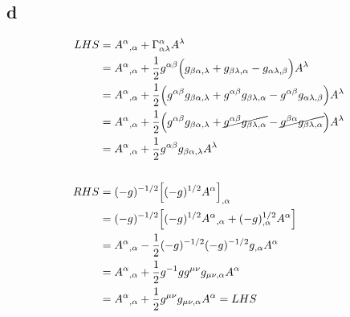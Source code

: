 \documentclass{article}
\begin{document}
\subsection*{d}
\begin{align*}
LHS &= A^\alpha{}_{,\alpha} + \Gamma^{\alpha}_{\alpha\lambda}A^\lambda \\
&= A^\alpha{}_{,\alpha} + \frac{1}{2}g^{\alpha\beta}\Big(g_{\beta\alpha,\lambda} + g_{\beta\lambda, \alpha} - g_{\alpha\lambda,\beta}\Big)A^\lambda \\
&= A^\alpha{}_{,\alpha} + \frac{1}{2}\Big(g^{\alpha\beta}g_{\beta\alpha,\lambda} + g^{\alpha\beta}g_{\beta\lambda, \alpha} -  g^{\alpha\beta}g_{\alpha\lambda,\beta}\Big)A^\lambda \\
&= A^\alpha{}_{,\alpha} + \frac{1}{2}\Big(g^{\alpha\beta}g_{\beta\alpha,\lambda} + \cancel{g^{\alpha\beta}g_{\beta\lambda, \alpha}} -  \cancel{g^{\beta\alpha}g_{\beta\lambda,\alpha}} \Big)A^\lambda  \\
&= A^\alpha{}_{,\alpha} + \frac{1}{2}g^{\alpha\beta}g_{\beta\alpha,\lambda}A^\lambda\\\\
RHS &= (-g)^{-1/2}\Big[(-g)^{1/2}A^\alpha\Big]_{,\alpha} \\
&= (-g)^{-1/2}\Big[(-g)^{1/2}A^\alpha{}_{,\alpha} + (-g)^{1/2}_{,\alpha}A^\alpha \Big] \\
& = A^\alpha{}_{,\alpha} - \frac{1}{2}(-g)^{-1/2} (-g)^{-1/2}g_{,\alpha}A^\alpha \\ 
& = A^\alpha{}_{,\alpha} + \frac{1}{2}g^{-1}gg^{\mu\nu}g_{\mu\nu,\alpha} A^\alpha \\ 
& = A^\alpha{}_{,\alpha} + \frac{1}{2}g^{\mu\nu}g_{\mu\nu,\alpha} A^\alpha = LHS
\end{align*}
\end{document}
